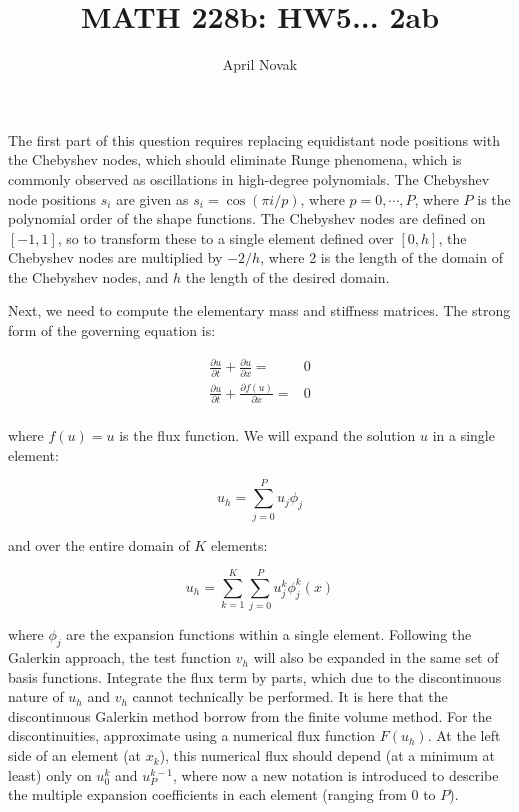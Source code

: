 \documentclass[10pt]{article}
\newcommand{\beq}{\begin{equation}}
\newcommand{\eeq}{\end{equation}}
\newcommand{\beqa}{\begin{equation}\begin{aligned}}
\newcommand{\eeqa}{\end{aligned}\end{equation}}
\begin{document}
\title{MATH 228b: HW5... 2ab}
\author{April Novak}

\maketitle

\section{}

The first part of this question requires replacing equidistant node positions with the Chebyshev nodes, which should eliminate Runge phenomena, which is commonly observed as oscillations in high-degree polynomials. The Chebyshev node positions \(s_i\) are given as \(s_i=\cos{(\pi i/p)}\), where \(p=0, \cdots, P\), where \(P\) is the polynomial order of the shape functions. The Chebyshev nodes are defined on \([-1, 1]\), so to transform these to a single element defined over \([0, h]\), the Chebyshev nodes are multiplied by \(-2/h\), where 2 is the length of the domain of the Chebyshev nodes, and \(h\) the length of the desired domain.

Next, we need to compute the elementary mass and stiffness matrices. The strong form of the governing equation is:

\beqa
\frac{\partial u}{\partial t}+\frac{\partial u}{\partial x}=&0\\
\frac{\partial u}{\partial t}+\frac{\partial f(u)}{\partial x}=&0\\
\eeqa

where \(f(u)=u\) is the flux function. We will expand the solution \(u\) in a single element:

\beq
u_h=\sum_{j=0}^{P}u_j\phi_j
\eeq

and over the entire domain of \(K\) elements:

\beq
u_h=\sum_{k=1}^{K}\sum_{j=0}^{P}u_j^k\phi_j^k(x)
\eeq

where \(\phi_j\) are the expansion functions within a single element. Following the Galerkin approach, the test function \(v_h\) will also be expanded in the same set of basis functions. Integrate the flux term by parts, which due to the discontinuous nature of \(u_h\) and \(v_h\) cannot technically be performed. It is here that the discontinuous Galerkin method borrow from the finite volume method. For the discontinuities, approximate using a numerical flux function \(F(u_h)\). At the left side of an element (at \(x_{k}\)), this numerical flux should depend (at a minimum at least) only on \(u_0^k\) and \(u_P^{k-1}\), where now a new notation is introduced to describe the multiple expansion coefficients in each element (ranging from 0 to \(P\)). 
\end{document}
